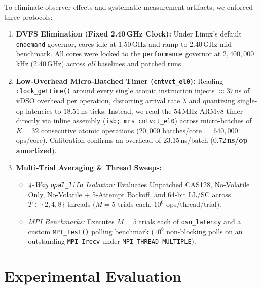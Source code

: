 \documentclass[conference]{IEEEtran}
\begin{document}
To eliminate observer effects and systematic measurement artifacts, we enforced three protocols:
\begin{enumerate}
    \item \textbf{DVFS Elimination (Fixed 2.40\,GHz Clock):} Under Linux's default \texttt{ondemand} governor, cores idle at 1.50\,GHz and ramp to 2.40\,GHz mid-benchmark. All cores were locked to the \texttt{performance} governor at $2{,}400{,}000$\,kHz (2.40\,GHz) across \emph{all} baselines and patched runs.
    \item \textbf{Low-Overhead Micro-Batched Timer (\texttt{cntvct\_el0}):} Reading \texttt{clock\_gettime()} around every single atomic instruction injects $\approx 37$\,ns of vDSO overhead per operation, distorting arrival rate $\lambda$ and quantizing single-op latencies to $18.51$\,ns ticks. Instead, we read the $54$\,MHz ARMv8 timer directly via inline assembly (\texttt{isb; mrs cntvct\_el0}) across micro-batches of $K=32$ consecutive atomic operations ($20{,}000$ batches/core $= 640{,}000$ ops/core). Calibration confirms an overhead of $23.15$\,ns/batch (\textbf{$0.72$\,ns/op amortized}).
    \item \textbf{Multi-Trial Averaging & Thread Sweeps:}
    \begin{itemize}
        \item \emph{4-Way \texttt{opal\_lifo} Isolation:} Evaluates Unpatched CAS128, No-Volatile Only, No-Volatile + 5-Attempt Backoff, and 64-bit LL/SC across $T \in \{2, 4, 8\}$ threads ($M=5$ trials each, $10^6$ ops/thread/trial).
        \item \emph{MPI Benchmarks:} Executes $M=5$ trials each of \texttt{osu\_latency} and a custom \texttt{MPI\_Test()} polling benchmark ($10^6$ non-blocking polls on an outstanding \texttt{MPI\_Irecv} under \texttt{MPI\_THREAD\_MULTIPLE}).
    \end{itemize}
\end{enumerate}

\section{Experimental Evaluation}
\end{document}
